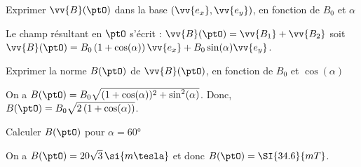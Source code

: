 \begin{enonce}
Exprimer $\vv{B}(\ptO)$ dans la base $\left(\vv{e_x},\vv{e_y}\right)$, en fonction de $B_0$ et $\alpha$
\end{enonce}


\begin{corrige}
Le champ résultant en $\ptO$ s'écrit : $\vv{B}(\ptO)= \vv{B_1} + \vv{B_2}$ soit
$\vv{B}(\ptO)= B_0 \left ( 1+ \cos(\alpha) \right ) \vv{e_x} + B_0 \sin(\alpha)\vv{e_y}$.
\end{corrige}


\begin{enonce}
Exprimer la norme $B(\ptO)$ de $\vv{B}(\ptO)$, en fonction de $B_0$ et $\cos(\alpha)$ 
\end{enonce}


\begin{corrige} 
On a $B(\ptO) = B_0 \sqrt{(1+\cos(\alpha))^2 + \sin^2(\alpha)}$.
Donc, $B(\ptO) = B_0 \sqrt{2\left(1+\cos(\alpha)\right)}$.
\end{corrige}



\begin{enonce}
Calculer $B(\ptO)$ pour $\alpha = \ang{60}$
\end{enonce}


\begin{corrige}
On a $B(\ptO)= 20 \sqrt{3} \, \si{m \tesla}$ et donc $B(\ptO)=\SI{34.6}{mT}$.
\end{corrige}

\finEntrainement



\newpage



